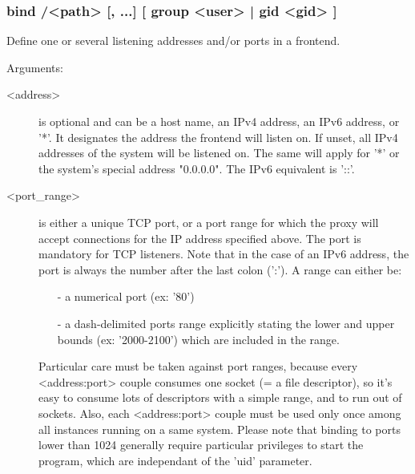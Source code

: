 \subsubsection*{bind /<path> [, ...] [ group <user> | gid <gid> ]}

  Define one or several listening addresses and/or ports in a frontend.
    
                                
  Arguments:
  \begin{description}
  \item[<address>]     is optional and can be a host name, an IPv4 address, an IPv6
                  address, or '*'. It designates the address the frontend will
                  listen on. If unset, all IPv4 addresses of the system will be
                  listened on. The same will apply for '*' or the system's
                  special address "0.0.0.0". The IPv6 equivalent is '::'.

  \item[<port\_range>]  is either a unique TCP port, or a port range for which the
                  proxy will accept connections for the IP address specified
                  above. The port is mandatory for TCP listeners. Note that in
                  the case of an IPv6 address, the port is always the number
                  after the last colon (':'). A range can either be:
                  
                  \begin{itemize}
                  \item[-] a numerical port (ex: '80')
                  \item[-] a dash-delimited ports range explicitly stating the lower
                     and upper bounds (ex: '2000-2100') which are included in
                     the range.
                  \end{itemize}

                  Particular care must be taken against port ranges, because
                  every <address:port> couple consumes one socket (= a file
                  descriptor), so it's easy to consume lots of descriptors
                  with a simple range, and to run out of sockets. Also, each
                  <address:port> couple must be used only once among all
                  instances running on a same system. Please note that binding
                  to ports lower than 1024 generally require particular
                  privileges to start the program, which are independant of
                  the 'uid' parameter.


\end{description}

